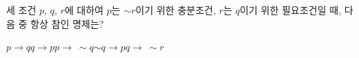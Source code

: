 세 조건 $p$, $q$, $r$에 대하여 $p$는 $\sim r$이기 위한 충분조건, $r$는 $q$이기 위한 필요조건일 때, 다음 중 항상 참인 명제는?
\begin{choices32}{$p\longrightarrow q$}{$q\longrightarrow p$}{$p\longrightarrow\ \sim q$}{$\sim q\longrightarrow p$}{$q\longrightarrow\ \sim r$}\end{choices32}
